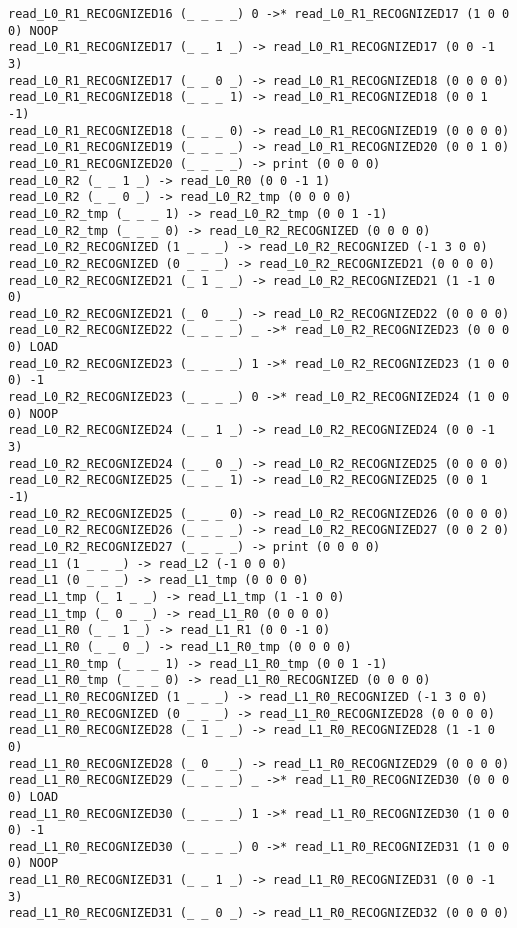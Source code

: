 \documentclass[english,shortabstract,mgr]{iithesis}
\begin{document}
\begin{verbatim}
read_L0_R1_RECOGNIZED16 (_ _ _ _) 0 ->* read_L0_R1_RECOGNIZED17 (1 0 0 0) NOOP
read_L0_R1_RECOGNIZED17 (_ _ 1 _) -> read_L0_R1_RECOGNIZED17 (0 0 -1 3)
read_L0_R1_RECOGNIZED17 (_ _ 0 _) -> read_L0_R1_RECOGNIZED18 (0 0 0 0)
read_L0_R1_RECOGNIZED18 (_ _ _ 1) -> read_L0_R1_RECOGNIZED18 (0 0 1 -1)
read_L0_R1_RECOGNIZED18 (_ _ _ 0) -> read_L0_R1_RECOGNIZED19 (0 0 0 0)
read_L0_R1_RECOGNIZED19 (_ _ _ _) -> read_L0_R1_RECOGNIZED20 (0 0 1 0)
read_L0_R1_RECOGNIZED20 (_ _ _ _) -> print (0 0 0 0)
read_L0_R2 (_ _ 1 _) -> read_L0_R0 (0 0 -1 1)
read_L0_R2 (_ _ 0 _) -> read_L0_R2_tmp (0 0 0 0)
read_L0_R2_tmp (_ _ _ 1) -> read_L0_R2_tmp (0 0 1 -1)
read_L0_R2_tmp (_ _ _ 0) -> read_L0_R2_RECOGNIZED (0 0 0 0)
read_L0_R2_RECOGNIZED (1 _ _ _) -> read_L0_R2_RECOGNIZED (-1 3 0 0)
read_L0_R2_RECOGNIZED (0 _ _ _) -> read_L0_R2_RECOGNIZED21 (0 0 0 0)
read_L0_R2_RECOGNIZED21 (_ 1 _ _) -> read_L0_R2_RECOGNIZED21 (1 -1 0 0)
read_L0_R2_RECOGNIZED21 (_ 0 _ _) -> read_L0_R2_RECOGNIZED22 (0 0 0 0)
read_L0_R2_RECOGNIZED22 (_ _ _ _) _ ->* read_L0_R2_RECOGNIZED23 (0 0 0 0) LOAD
read_L0_R2_RECOGNIZED23 (_ _ _ _) 1 ->* read_L0_R2_RECOGNIZED23 (1 0 0 0) -1
read_L0_R2_RECOGNIZED23 (_ _ _ _) 0 ->* read_L0_R2_RECOGNIZED24 (1 0 0 0) NOOP
read_L0_R2_RECOGNIZED24 (_ _ 1 _) -> read_L0_R2_RECOGNIZED24 (0 0 -1 3)
read_L0_R2_RECOGNIZED24 (_ _ 0 _) -> read_L0_R2_RECOGNIZED25 (0 0 0 0)
read_L0_R2_RECOGNIZED25 (_ _ _ 1) -> read_L0_R2_RECOGNIZED25 (0 0 1 -1)
read_L0_R2_RECOGNIZED25 (_ _ _ 0) -> read_L0_R2_RECOGNIZED26 (0 0 0 0)
read_L0_R2_RECOGNIZED26 (_ _ _ _) -> read_L0_R2_RECOGNIZED27 (0 0 2 0)
read_L0_R2_RECOGNIZED27 (_ _ _ _) -> print (0 0 0 0)
read_L1 (1 _ _ _) -> read_L2 (-1 0 0 0)
read_L1 (0 _ _ _) -> read_L1_tmp (0 0 0 0)
read_L1_tmp (_ 1 _ _) -> read_L1_tmp (1 -1 0 0)
read_L1_tmp (_ 0 _ _) -> read_L1_R0 (0 0 0 0)
read_L1_R0 (_ _ 1 _) -> read_L1_R1 (0 0 -1 0)
read_L1_R0 (_ _ 0 _) -> read_L1_R0_tmp (0 0 0 0)
read_L1_R0_tmp (_ _ _ 1) -> read_L1_R0_tmp (0 0 1 -1)
read_L1_R0_tmp (_ _ _ 0) -> read_L1_R0_RECOGNIZED (0 0 0 0)
read_L1_R0_RECOGNIZED (1 _ _ _) -> read_L1_R0_RECOGNIZED (-1 3 0 0)
read_L1_R0_RECOGNIZED (0 _ _ _) -> read_L1_R0_RECOGNIZED28 (0 0 0 0)
read_L1_R0_RECOGNIZED28 (_ 1 _ _) -> read_L1_R0_RECOGNIZED28 (1 -1 0 0)
read_L1_R0_RECOGNIZED28 (_ 0 _ _) -> read_L1_R0_RECOGNIZED29 (0 0 0 0)
read_L1_R0_RECOGNIZED29 (_ _ _ _) _ ->* read_L1_R0_RECOGNIZED30 (0 0 0 0) LOAD
read_L1_R0_RECOGNIZED30 (_ _ _ _) 1 ->* read_L1_R0_RECOGNIZED30 (1 0 0 0) -1
read_L1_R0_RECOGNIZED30 (_ _ _ _) 0 ->* read_L1_R0_RECOGNIZED31 (1 0 0 0) NOOP
read_L1_R0_RECOGNIZED31 (_ _ 1 _) -> read_L1_R0_RECOGNIZED31 (0 0 -1 3)
read_L1_R0_RECOGNIZED31 (_ _ 0 _) -> read_L1_R0_RECOGNIZED32 (0 0 0 0)

\end{verbatim}
\end{document}
